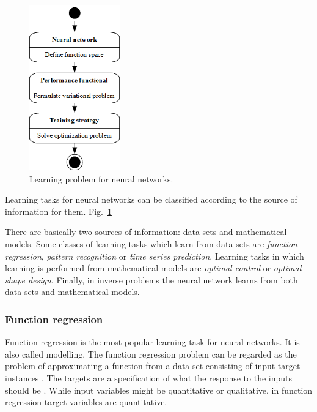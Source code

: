\begin{figure}[H]
	\begin{center}
		\includegraphics[width=0.35\textwidth]{neural_networks_basis/learning_problem}
		\caption{Learning problem for neural networks.}\label{LearningActivityDiagram}
	\end{center}
\end{figure}

Learning tasks for neural networks can be classified according to the source of information for them. Fig.~\ref{LearningActivityDiagram}

There are basically two sources of information: data sets and mathematical models. 
Some classes of learning tasks which learn from data sets are \emph{function regression}, \emph{pattern recognition} or \emph{time series prediction}. 
Learning tasks in which learning is performed from mathematical models are \emph{optimal control} or \emph{optimal shape design}. 
Finally, in inverse problems the neural network learns from both data sets and mathematical models.



\subsubsection{Function regression}

Function regression is the most popular learning task for neural networks. 
It is also called modelling. The function regression problem can be regarded as the problem of
approximating a function from a data set consisting of input-target instances
\cite{Haykin1994}. The targets are a specification
of what the response to the inputs should be \cite{Bishop1995}. 
While input variables might be quantitative or qualitative, in function regression target variables are quantitative. 

